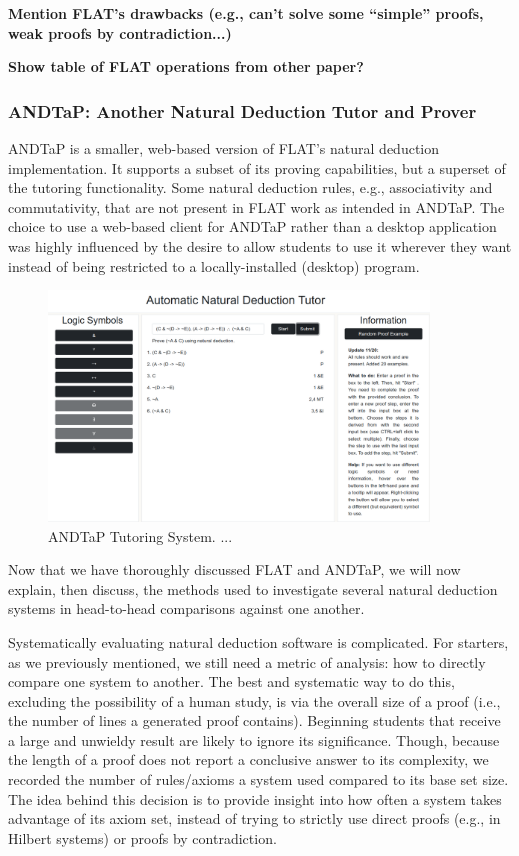\documentclass[ms]{uncgdissertationexp2}
\theoremstyle{plain}
\theoremstyle{definition}
\theoremstyle{remark}
\newcommand{\titlecaption}[2]{\caption[#1]{#1. #2}}
\begin{document}
\textbf{Mention FLAT's drawbacks (e.g., can't solve some ``simple'' proofs, weak proofs by contradiction...)}

\textbf{Show table of FLAT operations from other paper?}

\subsubsection{ANDTaP: Another Natural Deduction Tutor and Prover}
ANDTaP is a smaller, web-based version of FLAT's natural deduction implementation. It supports a subset of its proving capabilities, but a superset of the tutoring functionality. Some natural deduction rules, e.g., associativity and commutativity, that are not present in FLAT work as intended in ANDTaP. The choice to use a web-based client for ANDTaP rather than a desktop application was highly influenced by the desire to allow students to use it wherever they want instead of being restricted to a locally-installed (desktop) program.

\begin{figure}[!ht]
	\centering
	\includegraphics[width=0.9\textwidth]{andtap-tutor.png}
	\titlecaption{ANDTaP Tutoring System}{...}
	\label{fig:andtap}
\end{figure} 

Now that we have thoroughly discussed FLAT and ANDTaP, we will now explain, then discuss, the methods used to investigate several natural deduction systems in head-to-head comparisons against one another.

Systematically evaluating natural deduction software is complicated. For starters, as we previously mentioned, we still need a metric of analysis: how to directly compare one system to another. The best and systematic way to do this, excluding the possibility of a human study, is via the overall size of a proof (i.e., the number of lines a generated proof contains). Beginning students that receive a large and unwieldy result are likely to ignore its significance. Though, because the length of a proof does not report a conclusive answer to its complexity, we recorded the number of rules/axioms a system used compared to its base set size. The idea behind this decision is to provide insight into how often a system takes advantage of its axiom set, instead of trying to strictly use direct proofs (e.g., in Hilbert systems) or proofs by contradiction. 
\end{document}
